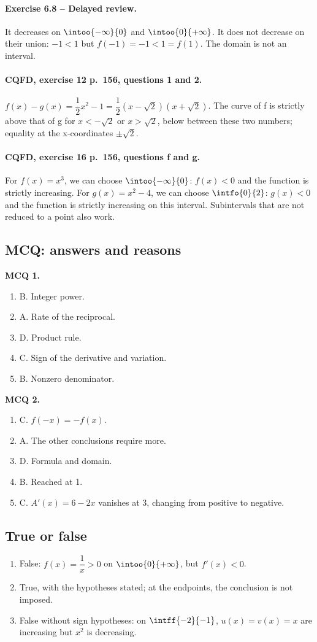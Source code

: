 \paragraph{Exercise 6.8 -- Delayed review.} It decreases on $\intoo{-\infty}{0}$ and $\intoo{0}{+\infty}$. It does not decrease on their union: $-1<1$ but $f(-1)=-1<1=f(1)$. The domain is not an interval.
\paragraph{CQFD, exercise 12 p.~156, questions 1 and 2.} $f(x)-g(x)=\dfrac12x^2-1=\dfrac12(x-\sqrt2)(x+\sqrt2)$. The curve of f is strictly above that of g for $x<-\sqrt2$ or $x>\sqrt2$, below between these two numbers; equality at the x-coordinates $\pm\sqrt2$.
\paragraph{CQFD, exercise 16 p.~156, questions f and g.} For $f(x)=x^3$, we can choose $\intoo{-\infty}{0}$: $f(x)<0$ and the function is strictly increasing. For $g(x)=x^2-4$, we can choose $\intfo{0}{2}$: $g(x)<0$ and the function is strictly increasing on this interval. Subintervals that are not reduced to a point also work.
\subsection*{MCQ: answers and reasons}
\textbf{MCQ 1.}
\begin{enumerate}
\item B. Integer power.
\item A. Rate of the reciprocal.
\item D. Product rule.
\item C. Sign of the derivative and variation.
\item B. Nonzero denominator.
\end{enumerate}
\textbf{MCQ 2.}
\begin{enumerate}
\item C. $f(-x)=-f(x)$.
\item A. The other conclusions require more.
\item D. Formula and domain.
\item B. Reached at 1.
\item C. $A\prime(x)=6-2x$ vanishes at 3, changing from positive to negative.
\end{enumerate}
\subsection*{True or false}
\begin{enumerate}
\item False: $f(x)=\dfrac{1}{x}>0$ on $\intoo{0}{+\infty}$, but $f\prime(x)<0$.
\item True, with the hypotheses stated; at the endpoints, the conclusion is not imposed.
\item False without sign hypotheses: on $\intff{-2}{-1}$, $u(x)=v(x)=x$ are increasing but $x^2$ is decreasing.
\end{enumerate}
